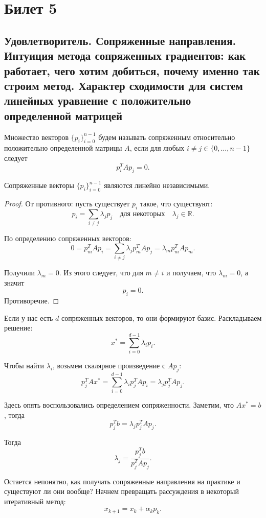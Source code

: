 \section{Билет 5}

\subsection{Удовлетворитель. Сопряженные направления. Интуиция метода сопряженных градиентов:
    как работает, чего хотим добиться, почему именно так строим метод.
    Характер сходимости для систем линейных уравнение с положительно
    определенной матрицей}

\begin{definition}
    Множество векторов $\{ p_i \}_{i=0}^{n-1}$ будем называть сопряженным относительно положительно определенной матрицы $A$,
    если для любых $i \neq j \in \{0, \dots, n - 1\}$ следует
    $$p_i^T A p_j = 0.$$
\end{definition}

\begin{theorem}
    Сопряженные векторы $\{ p_i \}_{i=0}^{n-1}$ являются линейно независимыми.
\end{theorem}
\begin{proof}
    От противного: пусть существует $p_i$ такое, что существуют:
    $$p_i = \sum_{i \neq j} \lambda_j p_j \quad \text{для некоторых} \quad \lambda_j \in \mathbb{R}.$$

    По определению сопряженных векторов:
    $$0 = p_m^T A p_i = \sum_{i \neq j} \lambda_j p_m^T A p_j = \lambda_m p_m^T A p_m.$$

    Получили $\lambda_m = 0$.
    Из этого следует, что для $m \neq i$ и получаем, что $\lambda_m = 0$, а значит $$p_i = 0.$$
    Противоречие.
\end{proof}

Если у нас есть $d$ сопряженных векторов, то они формируют базис. Раскладываем решение:
$$x^* = \sum_{i=0}^{d-1} \lambda_i p_i.$$

Чтобы найти $\lambda_i$, возьмем скалярное произведение с $A p_j$:
$$p_j^T A x^* = \sum_{i=0}^{d-1} \lambda_i p_j^T A p_i = \lambda_j p_j^T A p_j.$$

Здесь опять воспользовались определением сопряженности. Заметим, что $A x^* = b$, тогда
$$p_j^T b = \lambda_j p_j^T A p_j.$$

Тогда
$$\lambda_j = \frac{p_j^T b}{p_j^T A p_j}.$$

Остается непонятно, как получать сопряженные направления на практике и существуют ли они вообще? Начнем превращать рассуждения в некоторый итеративный метод:
$$x_{k+1} = x_k + \alpha_k p_k.$$

